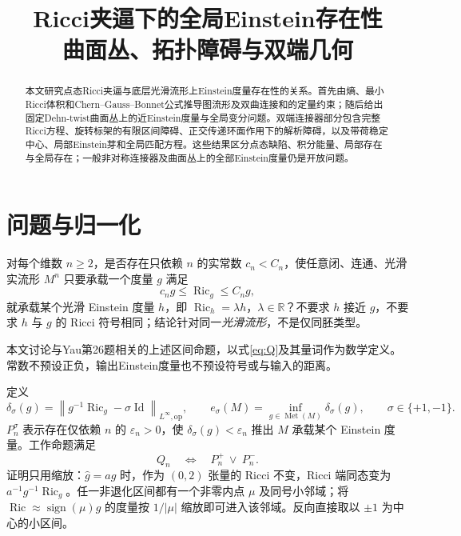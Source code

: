 \documentclass[UTF8,a4paper,11pt,fontset=fandol]{ctexart}
\title{Ricci夹逼下的全局Einstein存在性\\[0.5em]{\large 曲面丛、拓扑障碍与双端几何}}
\author{}
\date{}
\numberwithin{equation}{section}
\theoremstyle{definition}
\newcommand{\Ric}{\operatorname{Ric}}
\newcommand{\Met}{\operatorname{Met}}
\newcommand{\Id}{\operatorname{Id}}
\newcommand{\op}{\mathrm{op}}
\newcommand{\R}{\mathbb R}
\newcommand{\norm}[1]{\left\lVert#1\right\rVert}
\begin{document}
\maketitle
\begin{abstract}
本文研究点态Ricci夹逼与底层光滑流形上Einstein度量存在性的关系。首先由熵、最小Ricci体积和Chern--Gauss--Bonnet公式推导图流形及双曲连接和的定量约束；随后给出固定Dehn-twist曲面丛上的近Einstein度量与全局变分问题。双端连接器部分包含完整Ricci方程、旋转标架的有限区间障碍、正交传递环面作用下的解析障碍，以及带荷稳定中心、局部Einstein芽和全局匹配方程。这些结果区分点态缺陷、积分能量、局部存在与全局存在；一般非对称连接器及曲面丛上的全部Einstein度量仍是开放问题。
\end{abstract}
\begingroup
\small\linespread{1.0}\selectfont\setlength{\parskip}{0pt}
\tableofcontents
\endgroup
\clearpage

\section{问题与归一化}
对每个维数 $n\ge2$，是否存在只依赖 $n$ 的实常数 $c_n<C_n$，使任意闭、连通、光滑实流形 $M^n$ 只要承载一个度量 $g$ 满足
\begin{equation}\label{eq:Q}
 c_ng\le\Ric_g\le C_ng,
\end{equation}
就承载某个光滑 Einstein 度量 $h$，即 $\Ric_h=\lambda h$，$\lambda\in\R$？不要求 $h$ 接近 $g$，不要求 $h$ 与 $g$ 的 Ricci 符号相同；结论针对同一\emph{光滑流形}，不是仅同胚类型。

本文讨论与Yau第26题\cite{Yau1982}相关的上述区间命题，以式\eqref{eq:Q}及其量词作为数学定义。常数不预设正负，输出Einstein度量也不预设符号或与输入的距离。

定义
\begin{equation}\label{eq:defect}
 \delta_\sigma(g)=\norm{g^{-1}\Ric_g-\sigma\Id}_{L^\infty,\op},\qquad
 e_\sigma(M)=\inf_{g\in\Met(M)}\delta_\sigma(g),\qquad \sigma\in\{+1,-1\}.
\end{equation}
$P_n^\sigma$ 表示存在仅依赖 $n$ 的 $\varepsilon_n>0$，使 $\delta_\sigma(g)<\varepsilon_n$ 推出 $M$ 承载某个 Einstein 度量。工作命题满足
\begin{equation}\label{eq:branches}
 Q_n\quad\Longleftrightarrow\quad P_n^+\ \lor\ P_n^-.
\end{equation}
证明只用缩放：$\widehat g=ag$ 时，作为 $(0,2)$ 张量的 Ricci 不变，Ricci 端同态变为 $a^{-1}g^{-1}\Ric_g$。任一非退化区间都有一个非零内点 $\mu$ 及同号小邻域；将 $\Ric\approx\operatorname{sign}(\mu)g$ 的度量按 $1/|\mu|$ 缩放即可进入该邻域。反向直接取以 $\pm1$ 为中心的小区间。
\end{document}
